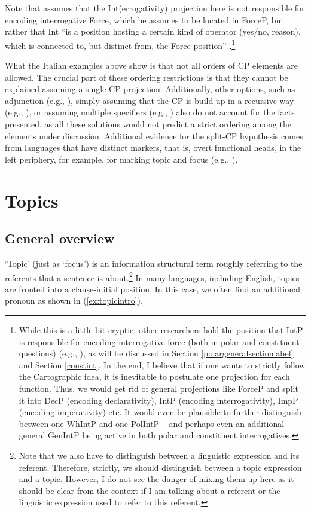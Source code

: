 \noindent Note that \citet{rizzi2001position} assumes that the Int(errogativity) projection here is not responsible for encoding interrogative Force, which he assumes to be located in ForceP, but rather that Int ``is a position hosting a certain kind of operator (yes/no, reason), which is connected to, but distinct from, the Force position'' \citep[206]{rizzi2013notes}.\footnote{ While this is a little bit cryptic, other researchers hold the position that IntP is responsible for encoding interrogative force (both in polar and constituent questions) (e.g., \citealt{aboh2010sa}), as will be discussed in Section \ref{polargeneralsectionlabel} and Section \ref{constint}. In the end, I believe that if one wants to strictly follow the Cartographic idea, it is inevitable to postulate one projection for each function. Thus, we would get rid of general projections like ForceP and split it into DecP (encoding declarativity), IntP (encoding interrogativity), ImpP (encoding imperativity) etc. It would even be plausible to further distinguish between one WhIntP and one PolIntP -- and perhaps even an additional general GenIntP being active in both polar and constituent interrogatives.}

What the Italian examples above show is that not all orders of CP elements are allowed. The crucial part of these ordering restrictions is that they cannot be explained assuming a single CP projection. Additionally, other options, such as adjunction (e.g., \citealt{de2007french}), simply assuming that the CP is build up in a recursive way (e.g., \citealt{mccloskey1992adjunction, suner1993indirect}), or assuming multiple specifiers (e.g., \citealt{chomsky1995categories}) also do not account for the facts presented, as all these solutions would not predict a strict ordering among the elements under discussion. Additional evidence for the split-CP hypothesis comes from languages that have distinct markers, that is, overt functional heads, in the left periphery, for example, for marking topic and focus (e.g., \citealt{aboh2004left}).

\section{Topics}\label{generaltopicsection}

\subsection{General overview}
\label{finersplitstopics}
`Topic' (just as `focus') is an information structural term roughly referring to the referents that a sentence is about.\footnote{ Note that we also have to distinguish between a linguistic expression and its referent. Therefore, strictly, we should distinguish between a topic expression and a topic. However, I do not see the danger of mixing them up here as it should be clear from the context if I am talking about a referent or the linguistic expression used to refer to this referent.} In many languages, including English, topics are fronted into a clause-initial position. In this case, we often find an additional pronoun as shown in (\ref{ex:topicintro}).

